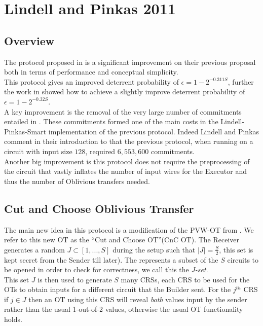 \documentclass[ %
                    author={Nicholas Tutte},
                supervisor={Prof. Nigel Smart},
                    degree={MEng},
                     title={Secure Two Party Computation},
                  subtitle={A practical comparison of recent protocols},
                      type={Research - GG1K},
                      year={2015} ]{dissertation}
\begin{document}
		\section{Lindell and Pinkas 2011}
			\subsection{Overview}
				The protocol proposed in \cite{LindellAndPinkas2011} is a significant improvement on their previous proposal \cite{LindellAndPinkas2007} both in terms of performance and conceptual simplicity.\\

				This protocol gives an improved deterrent probability of $\epsilon = 1 - 2^{-0.311 S}$, further the work in \cite{ShelatAndShen} showed how to achieve a slightly improve deterrent probability of $\epsilon = 1 - 2^{-0.32 S}$.\\

				A key improvement is the removal of the very large number of commitments entailed in \cite{LindellAndPinkas2007}. These commitments formed one of the main costs in the Lindell-Pinkas-Smart\cite{LindellPinkasSmart2008} implementation of the previous protocol. Indeed Lindell and Pinkas comment in their introduction to \cite{LindellAndPinkas2011} that the previous protocol, when running on a circuit with input size $128$, required $6,553,600$ commitments.\\

				Another big improvement is this protocol does not require the preprocessing of the circuit that vastly inflates the number of input wires for the Executor and thus the number of Oblivious transfers needed.

			\subsection{Cut and Choose Oblivious Transfer}
				The main new idea in this protocol is a modification of the PVW-OT from \cite{PVW_OT_2008}. We refer to this new OT as the ``Cut and Choose OT''(CnC OT). The Receiver generates a random $J \subset [1, ..., S]$ during the setup such that $\vert J \vert = \frac{S}{2}$,  this set is kept secret from the Sender till later). The represents a subset of the $S$ circuits to be opened in order to check for correctness, we call this the \emph{J-set}.\\

				This set $J$ is then used to generate $S$ many CRSs, each CRS to be used for the OTs to obtain inputs for a different circuit that the Builder sent. For the $j^{th}$ CRS if $j \in J$ then an OT using this CRS will reveal \emph{both} values input by the sender rather than the usual 1-out-of-2 values, otherwise the usual OT functionality holds.\\
\end{document}
